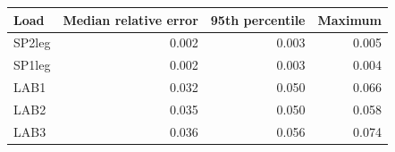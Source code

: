 \begin{tabular}{lrrr}
\toprule
Load & Median relative error & 95th percentile & Maximum \\
\midrule
SP2leg & 0.002 & 0.003 & 0.005 \\
SP1leg & 0.002 & 0.003 & 0.004 \\
LAB1 & 0.032 & 0.050 & 0.066 \\
LAB2 & 0.035 & 0.050 & 0.058 \\
LAB3 & 0.036 & 0.056 & 0.074 \\
\bottomrule
\end{tabular}
